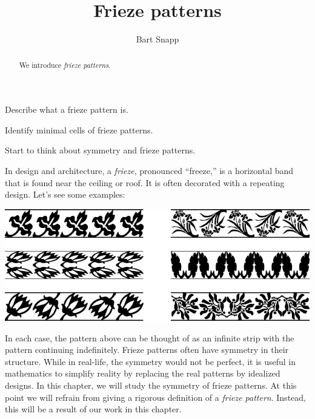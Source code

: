 \documentclass[noauthor,nooutcomes,12pt,hints,handout]{ximera}
\author{Bart Snapp}
\title{Frieze patterns}
\begin{document}
\begin{abstract}
  We introduce \emph{frieze patterns}.
\end{abstract}
\maketitle

\begin{listOutcomes}
\item Describe what a frieze pattern is.
\item Identify minimal cells of frieze patterns.
\item Start to think about symmetry and frieze patterns.
\end{listOutcomes}

In design and architecture, a \emph{frieze},
pronounced ``freeze,'' is a horizontal band that is found near the
ceiling or roof. It is often decorated with a repeating design. Let's
see some examples:
\begin{center}
\includegraphics[width=.6\textwidth]{fpfrieze.pdf}
\end{center}
In each case, the pattern above can be thought of as an infinite strip
with the pattern continuing indefinitely.  Frieze patterns often have
symmetry in their structure. While in real-life, the symmetry would
not be perfect, it is useful in mathematics to simplify reality by
replacing the real patterns by idealized designs.  In this chapter, we
will study the symmetry of frieze patterns. At this point we will
refrain from giving a rigorous definition of a \emph{frieze
  pattern}. Instead, this will be a result of our work in this
chapter.
\end{document}
